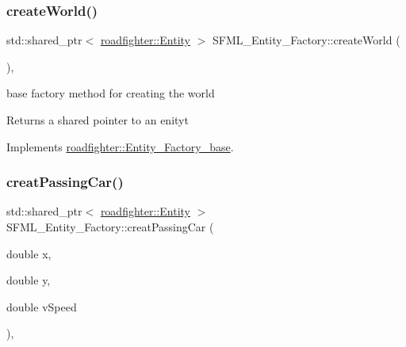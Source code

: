 \mbox{\label{classSFML__Entity__Factory_a3a6743085eb4c1793be523fe07724328}} 
\subsubsection{\texorpdfstring{create\+World()}{createWorld()}}
{\footnotesize\ttfamily std\+::shared\+\_\+ptr$<$ \hyperlink{classroadfighter_1_1Entity}{roadfighter\+::\+Entity} $>$ S\+F\+M\+L\+\_\+\+Entity\+\_\+\+Factory\+::create\+World (\begin{DoxyParamCaption}{ }\end{DoxyParamCaption})\hspace{0.3cm}{\ttfamily [override]}, {\ttfamily [virtual]}}

base factory method for creating the world \begin{DoxyReturn}{Returns}
a shared pointer to an enityt 
\end{DoxyReturn}


Implements \hyperlink{classroadfighter_1_1Entity__Factory__base_aa24de6bbeb80c25e96f3e24d6bcb5169}{roadfighter\+::\+Entity\+\_\+\+Factory\+\_\+base}.

\mbox{\label{classSFML__Entity__Factory_afe1acae3b9c6d07ac30426a72ad390d0}} 
\subsubsection{\texorpdfstring{creat\+Passing\+Car()}{creatPassingCar()}}
{\footnotesize\ttfamily std\+::shared\+\_\+ptr$<$ \hyperlink{classroadfighter_1_1Entity}{roadfighter\+::\+Entity} $>$ S\+F\+M\+L\+\_\+\+Entity\+\_\+\+Factory\+::creat\+Passing\+Car (\begin{DoxyParamCaption}\item[{double}]{x,  }\item[{double}]{y,  }\item[{double}]{v\+Speed }\end{DoxyParamCaption})\hspace{0.3cm}{\ttfamily [override]}, {\ttfamily [virtual]}}

